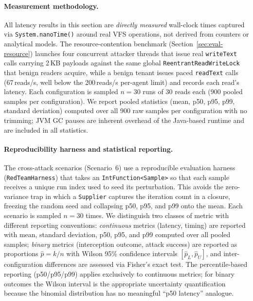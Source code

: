 \paragraph{Measurement methodology.}
All latency results in this section are \emph{directly measured} wall-clock
times captured via \texttt{System.nanoTime()} around real VFS operations, not
derived from counters or analytical models. The resource-contention benchmark
(Section~\ref{sec:eval-resource}) launches four concurrent attacker threads that
issue real \texttt{writeText} calls carrying 2\,KB payloads against the same
global \texttt{ReentrantReadWriteLock} that benign readers acquire, while a
benign tenant issues paced \texttt{readText} calls (67\,reads/s, well below
the 200\,reads/s per-agent limit) and records each read's latency. Each
configuration is sampled $n=30$ runs of 30 reads each (900 pooled samples per
configuration). We report pooled statistics (mean, p50, p95, p99, standard
deviation) computed over all 900 raw samples per configuration with no
trimming; JVM GC pauses are inherent overhead of the Java-based runtime and
are included in all statistics.

\paragraph{Reproducibility harness and statistical reporting.}
The cross-attack scenarios (Scenario~6) use a reproducible evaluation
harness (\texttt{RedTeamHarness}) that takes an \texttt{IntFunction<Sample>} so that
each sample receives a unique run index used to seed its perturbation. This
avoids the zero-variance trap in which a \texttt{Supplier} captures the
iteration count in a closure, freezing the random seed and collapsing p50,
p95, and p99 onto the mean. Each scenario is sampled $n=30$ times. We
distinguish two classes of metric with different reporting conventions:
\emph{continuous} metrics (latency, timing) are reported with mean, standard
deviation, p50, p95, and p99 computed over all pooled samples; \emph{binary}
metrics (interception outcome, attack success) are reported as proportions
$\hat{p} = k/n$ with Wilson 95\% confidence intervals
$[\hat{p}_L, \hat{p}_U]$, and inter-configuration differences are assessed
via Fisher's exact test. The percentile-based reporting (p50/p95/p99)
applies exclusively to continuous metrics; for binary outcomes the Wilson
interval is the appropriate uncertainty quantification because the binomial
distribution has no meaningful ``p50 latency'' analogue.

